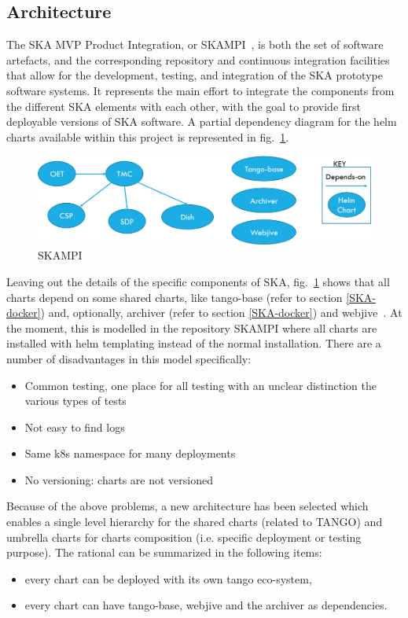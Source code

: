 \documentclass[a4paper]{spie}  %
\begin{document}
\subsection{Architecture}

The SKA MVP Product Integration, or SKAMPI~\cite{SKAMPI}, is both the set of software artefacts, and the corresponding repository and continuous integration facilities that allow for the development, testing, and integration of the SKA prototype software systems. It represents the main effort to integrate the components from the different SKA elements with each other, with the goal to provide first deployable versions of SKA software. A partial dependency diagram for the helm charts available within this project is represented in fig.~\ref{fig:skampi}. 

\begin{figure}[!htb]
   \centering
   \includegraphics*[width=1\columnwidth]{simple_skampi}
   \caption{SKAMPI}
   \label{fig:skampi}
\end{figure}

Leaving out the details of the specific components of SKA, fig.~\ref{fig:skampi} shows that all charts depend on some shared charts, like tango-base (refer to section \ref{SKA-docker}) and, optionally, archiver (refer to section \ref{SKA-docker}) and webjive~\cite{webjive}.  
At the moment, this is modelled in the repository SKAMPI where all charts are installed with helm templating instead of the normal installation. There are a number of disadvantages in this model specifically:

\begin{itemize}
    \item Common testing, one place for all testing with an unclear distinction the various types of tests
    \item Not easy to find logs
    \item Same k8s namespace for many deployments
    \item No versioning: charts are not versioned
\end{itemize}

Because of the above problems, a new architecture has been selected which enables a single level hierarchy for the shared charts (related to TANGO) and umbrella charts for charts composition (i.e. specific deployment or testing purpose). The rational can be summarized in the following items:
\begin{itemize}
    \item every chart can be deployed with its own tango eco-system,
    \item every chart can have tango-base, webjive and the archiver as dependencies.
\end{itemize}
\end{document}
